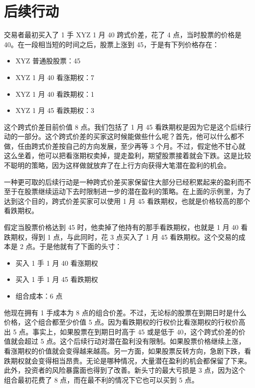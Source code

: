 \section{后续行动}
\begin{tcolorbox}
    交易者最初买入了 1 手 XYZ 1 月 40 跨式价差，花了 4 点，当时股票的价格是 40。在一段相当短的时间之后，股票上涨到 45，于是有下列价格存在：
    \begin{itemize}
        \item XYZ 普通股股票：45
        \item XYZ 1 月 40 看涨期权：7
        \item XYZ 1 月 40 看跌期权：1
        \item XYZ 1 月 45 看跌期权：3
    \end{itemize}
    这个跨式价差目前价值 8 点。我们包括了 1 月 45 看跌期权是因为它是这个后续行动的一部分。这个跨式价差的买家这时候能做些什么呢？首先，他可以什么都不做，任由跨式价差按自己的方向发展，至少再等 3 个月。不过，假定他不甘心就这么坐着，他可以把看涨期权卖掉，提走盈利，期望股票接着就会下跌。这是比较不聪明的策略，因为这样做就放弃了在上行方向获得大笔潜在盈利的机会。
\end{tcolorbox}
一种更可取的后续行动是一种跨式价差买家保留住大部分已经积累起来的盈利而不至于在股票继续运动下去时限制进一步的潜在盈利的策略。在上面的示例里，为了达到这个目的，跨式价差买家可以使用 1 月 45 看跌期权，也就是价格较高的那个看跌期权。
\begin{tcolorbox}
    假定当股票价格达到 45 时，他卖掉了他持有的那手看跌期权，也就是 1 月 40 看跌期权，得到 1 点，与此同时，花 3 点买入了 1 月 45 看跌期权。这个交易的成本是 2 点。于是他就有了下面的头寸：
    \begin{itemize}
        \item 买入 1 手 1 月 40 看涨期权
        \item 买入 1 手 1 月 45 看跌期权
        \item 组合成本：6 点
    \end{itemize}
\end{tcolorbox}
他现在拥有 1 手成本为 8 点的组合价差。不过，无论标的股票在到期日时是什么价格，这个组合都至少价值 5 点。因为看跌期权的行权价比看涨期权的行权价高出 5 点。事实上，如果股票在到期日时高于 45 或是低于 40，这个跨式价差的价值就会超过 5 点。这个后续行动对潜在盈利没有限制。如果股票价格继续上涨，看涨期权的价值就会变得越来越高。另一方面，如果股票反转方向，急剧下跌，看跌期权就会变得相当昂贵。无论是哪种情况，大量潜在盈利的机会都保留了下来。此外，投资者的风险暴露面也得到了改善。新头寸的最大亏损是 3 点，因为这个组合最初花费了 8 点，而在最不利的情况下它也可以买到 5 点。

